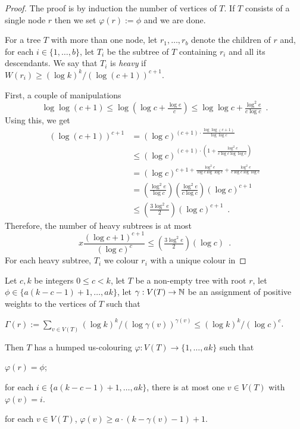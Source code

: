 \documentclass[kpfonts]{patmorin}
\begin{document}
\begin{proof}
    The proof is by induction the number of vertices of $T$. If $T$ consists of a single node $r$ then we set $\varphi(r):=\phi$ and we are done.

    For a tree $T$ with more than one node, let $r_1,\ldots,r_b$ denote the children of $r$ and, for each $i\in\{1,\ldots,b\}$, let $T_i$ be the subtree of $T$ containing $r_i$ and all its descendants.  We say that $T_i$ is \emph{heavy} if $W(r_i)\ge (\log k)^k/(\log (c+1))^{c+1}$.

    First, a couple of manipulations
    \begin{equation}
        \log\log(c+1) \le \log\left(\log c + \tfrac{\log e}{c}\right)
        \le \log\log c + \tfrac{\log^2 e}{c\log c} \enspace .
    \end{equation}
    Using this, we get
    \begin{align*}
        (\log(c+1))^{c+1}
        & = (\log c)^{(c+1)\cdot\tfrac{\log\log(c+1)}{\log\log c}} \\
        & \le (\log c)^{(c+1)\cdot\left(1+\tfrac{\log^2 e}{c\log c\log\log c}\right)} \\
        & = (\log c)^{c + 1 + \tfrac{\log^2 e}{\log c\log\log c} + \tfrac{\log^2 e}{c\log c\log\log c}} \\
        & = \left(\tfrac{\log^2 e}{\log c}\right)\left(\tfrac{\log^2 e}{c\log c} \right)(\log c)^{c+1} \\
        & \le \left(\tfrac{3\log^2 e}{2}\right)(\log c)^{c+1} \enspace .
    \end{align*}
    Therefore, the number of heavy subtrees is at most
    \[  x\frac{(\log c+1)^{c+1}}{(\log c)^c} \le \left(\tfrac{3\log^2 e}{2}\right)(\log c) \enspace . \]
    For each heavy subtree, $T_i$ we colour $r_i$ with a unique colour in
\end{proof}






\begin{lem}
Let $c,k$ be integers $0\le c< k$, let $T$ be a non-empty tree with root $r$, let $\phi\in\{a(k-c-1)+1,\ldots,ak\}$, let $\gamma:V(T)\to\mathbb{N}$ be an assignment of positive weights to the vertices of $T$ such that
\begin{compactenum}[(R1)]
    \item $\Gamma(r):=\sum_{v\in V(T)} (\log k)^k/(\log \gamma(v))^{\gamma(v)} \le (\log k)^k/(\log c)^c$. \label{total-weight}
\end{compactenum}
Then $T$ has a humped us-colouring $\varphi:V(T)\to\{1,\ldots,ak\}$ such that
\begin{compactenum}[(P1)]
    \item $\varphi(r)=\phi$;
    \item for each $i\in\{a(k-c-1)+1,\ldots,ak\}$, there is at most one $v\in V(T)$ with $\varphi(v)=i$.
    \item for each $v\in V(T)$, $\varphi(v)\ge a\cdot(k-\gamma(v)-1)+1$.
\end{compactenum}
\end{lem}
\end{document}
